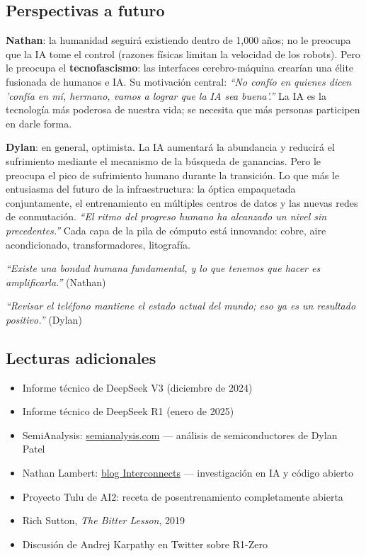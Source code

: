 \subsection{Perspectivas a futuro}

\textbf{Nathan}: la humanidad seguirá existiendo dentro de 1,000 años; no le preocupa que la IA tome el control (razones físicas limitan la velocidad de los robots). Pero le preocupa el \textbf{tecnofascismo}: las interfaces cerebro-máquina crearían una élite fusionada de humanos e IA. Su motivación central: \textit{``No confío en quienes dicen 'confía en mí, hermano, vamos a lograr que la IA sea buena'.''} La IA es la tecnología más poderosa de nuestra vida; se necesita que más personas participen en darle forma.

\textbf{Dylan}: en general, optimista. La IA aumentará la abundancia y reducirá el sufrimiento mediante el mecanismo de la búsqueda de ganancias. Pero le preocupa el pico de sufrimiento humano durante la transición. Lo que más le entusiasma del futuro de la infraestructura: la óptica empaquetada conjuntamente, el entrenamiento en múltiples centros de datos y las nuevas redes de conmutación. \textit{``El ritmo del progreso humano ha alcanzado un nivel sin precedentes.''} Cada capa de la pila de cómputo está innovando: cobre, aire acondicionado, transformadores, litografía.

\textit{``Existe una bondad humana fundamental, y lo que tenemos que hacer es amplificarla.''} (Nathan)

\textit{``Revisar el teléfono mantiene el estado actual del mundo; eso ya es un resultado positivo.''} (Dylan)

\subsection{Lecturas adicionales}

\begin{itemize}
    \item Informe técnico de DeepSeek V3 (diciembre de 2024)
    \item Informe técnico de DeepSeek R1 (enero de 2025)
    \item SemiAnalysis: \href{https://semianalysis.com}{semianalysis.com} — análisis de semiconductores de Dylan Patel
    \item Nathan Lambert: \href{https://www.interconnects.ai}{blog Interconnects} — investigación en IA y código abierto
    \item Proyecto Tulu de AI2: receta de posentrenamiento completamente abierta
    \item Rich Sutton, \textit{The Bitter Lesson}, 2019
    \item Discusión de Andrej Karpathy en Twitter sobre R1-Zero
\end{itemize}



